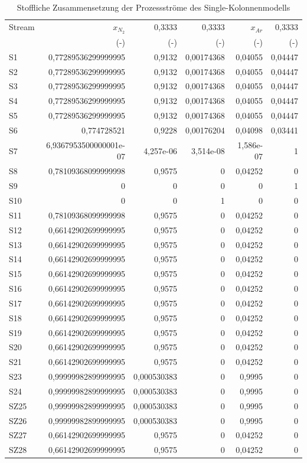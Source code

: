 \begin{longtable}{lrrrrr}
\caption{Stoffliche Zusammensetzung der Prozessströme des Single-Kolonnenmodells} \\
\hline
Stream & $x_{N_2}$ & 0,3333 & 0,3333 & $x_{Ar}$ & 0,3333 \\
 & (-) & (-) & (-) & (-) & (-) \\
\hline
S1 & 0,77289536299999995 & 0,9132 & 0,00174368 & 0,04055 & 0,04447 \\
S2 & 0,77289536299999995 & 0,9132 & 0,00174368 & 0,04055 & 0,04447 \\
S3 & 0,77289536299999995 & 0,9132 & 0,00174368 & 0,04055 & 0,04447 \\
S4 & 0,77289536299999995 & 0,9132 & 0,00174368 & 0,04055 & 0,04447 \\
S5 & 0,77289536299999995 & 0,9132 & 0,00174368 & 0,04055 & 0,04447 \\
S6 & 0,774728521 & 0,9228 & 0,00176204 & 0,04098 & 0,03441 \\
S7 & 6,9367953500000001e-07 & 4,257e-06 & 3,514e-08 & 1,586e-07 & 1 \\
S8 & 0,78109368099999998 & 0,9575 & 0 & 0,04252 & 0 \\
S9 & 0 & 0 & 0 & 0 & 1 \\
S10 & 0 & 0 & 1 & 0 & 0 \\
S11 & 0,78109368099999998 & 0,9575 & 0 & 0,04252 & 0 \\
S12 & 0,66142902699999995 & 0,9575 & 0 & 0,04252 & 0 \\
S13 & 0,66142902699999995 & 0,9575 & 0 & 0,04252 & 0 \\
S14 & 0,66142902699999995 & 0,9575 & 0 & 0,04252 & 0 \\
S15 & 0,66142902699999995 & 0,9575 & 0 & 0,04252 & 0 \\
S16 & 0,66142902699999995 & 0,9575 & 0 & 0,04252 & 0 \\
S17 & 0,66142902699999995 & 0,9575 & 0 & 0,04252 & 0 \\
S18 & 0,66142902699999995 & 0,9575 & 0 & 0,04252 & 0 \\
S19 & 0,66142902699999995 & 0,9575 & 0 & 0,04252 & 0 \\
S20 & 0,66142902699999995 & 0,9575 & 0 & 0,04252 & 0 \\
S21 & 0,66142902699999995 & 0,9575 & 0 & 0,04252 & 0 \\
S23 & 0,99999982899999995 & 0,000530383 & 0 & 0,9995 & 0 \\
S24 & 0,99999982899999995 & 0,000530383 & 0 & 0,9995 & 0 \\
SZ25 & 0,99999982899999995 & 0,000530383 & 0 & 0,9995 & 0 \\
SZ26 & 0,99999982899999995 & 0,000530383 & 0 & 0,9995 & 0 \\
SZ27 & 0,66142902699999995 & 0,9575 & 0 & 0,04252 & 0 \\
SZ28 & 0,66142902699999995 & 0,9575 & 0 & 0,04252 & 0 \\
\hline
\end{longtable}